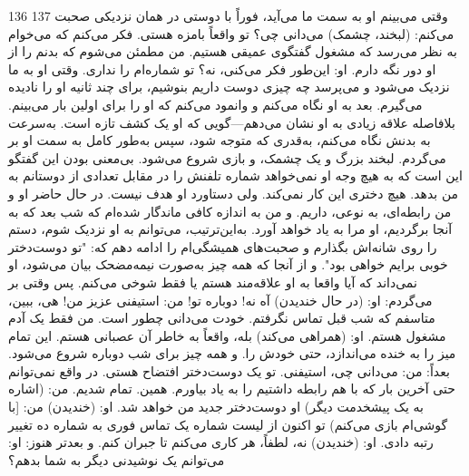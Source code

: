 136 137
وقتی می‌بینم او به سمت ما می‌آید، فوراً با دوستی در همان نزدیکی صحبت می‌کنم: (لبخند، چشمک) می‌دانی چی؟ تو واقعاً بامزه هستی. فکر می‌کنم که می‌خوام
به نظر می‌رسد که مشغول گفتگوی عمیقی هستیم. من مطمئن می‌شوم که بدنم را از او دور نگه دارم. او: این‌طور فکر می‌کنی، نه؟ تو شماره‌ام را نداری.
وقتی او به ما نزدیک می‌شود و می‌پرسد چه چیزی دوست داریم بنوشیم، برای چند ثانیه او را نادیده می‌گیرم. بعد به او نگاه می‌کنم و وانمود می‌کنم که 
او را برای اولین بار می‌بینم. بلافاصله علاقه زیادی به او نشان می‌دهم—گویی که او یک کشف تازه است. به‌سرعت به بدنش نگاه می‌کنم، به‌قدری که متوجه شود، سپس به‌طور کامل 
به سمت او بر می‌گردم. لبخند بزرگ و یک چشمک، و بازی شروع می‌شود.
بی‌معنی بودن این گفتگو این است که به هیچ وجه او نمی‌خواهد شماره تلفنش را در مقابل تعدادی از دوستانم به من بدهد. هیچ دختری این کار نمی‌کند. ولی دستاورد او هدف 
نیست. در حال حاضر او و من رابطه‌ای، به نوعی، داریم. و من به اندازه کافی ماندگار شده‌ام که شب بعد که به آنجا برگردیم، او مرا به یاد خواهد آورد.
به‌این‌ترتیب، می‌توانم به او نزدیک شوم، دستم را روی شانه‌اش بگذارم و صحبت‌های همیشگی‌ام را ادامه دهم که: "تو دوست‌دختر خوبی برایم خواهی بود". و از آنجا که همه چیز
به‌صورت نیمه‌مضحک بیان می‌شود، او نمی‌داند که آیا واقعا به او علاقه‌مند هستم یا فقط شوخی می‌کنم. پس وقتی بر می‌گردم:
او: (در حال خندیدن) آه نه! دوباره تو!
من: استیفنی عزیز من! هی، ببین، متاسفم که شب قبل تماس نگرفتم. خودت می‌دانی چطور است. من فقط یک آدم مشغول هستم.
او: (همراهی می‌کند) بله، واقعاً به خاطر آن عصبانی هستم.
این تمام میز را به خنده می‌اندازد، حتی خودش را. و همه چیز برای شب دوباره شروع می‌شود.
بعداً:
من: می‌دانی چی، استیفنی. تو یک دوست‌دختر افتضاح هستی. در واقع نمی‌توانم حتی آخرین بار که با هم رابطه داشتیم را به یاد بیاورم. همین. تمام شدیم.
من: (اشاره به یک پیشخدمت دیگر) او دوست‌دختر جدید من خواهد شد.
او: (خندیدن)
من: [با گوشی‌ام بازی می‌کنم) تو اکنون از لیست شماره یک تماس فوری به شماره ده تغییر رتبه دادی.
او: (خندیدن) نه، لطفاً، هر کاری می‌کنم تا جبران کنم.
و بعدتر هنوز:
او: می‌توانم یک نوشیدنی دیگر به شما بدهم؟